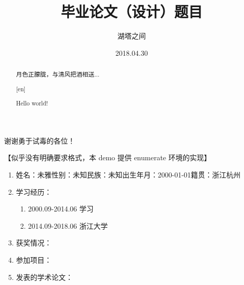 \documentclass[fangfont=STFANGSO.TTF,heifont=simhei.ttf,nocolorbib]{zju-thesis}
\title{毕业论文（设计）题目}{浙江大学本科生毕业论文（设计）}
\author{湖塔之间}{3140100000}
\date{2018.04.30}
\begin{document}
	\makecover
	
	\begin{acknowledgement}
	谢谢勇于试毒的各位！
	\end{acknowledgement}
	\begin{abstract}
	月色正朦胧，与清风把酒相送...


	\end{abstract}
	\begin{abstract}[en]

	Hello world!

	\end{abstract}
	
    \tableofcontents
	\begin{refsection}
	
	\end{refsection}
	\begin{resume}
		【似乎没有明确要求格式，本 demo 提供 enumerate 环境的实现】

		\begin{enumerate}[label=,leftmargin=0em]
		\item 姓名：未雅\quad 性别：未知\quad 民族：未知\quad 出生年月：2000-01-01\quad 籍贯：浙江杭州
		\item 学习经历：
		\begin{enumerate}[label=]
		\item 2000.09-2014.06 学习
		\item 2014.09-2018.06 浙江大学
		\end{enumerate}
		\item 获奖情况：
		\item 参加项目：
		\item 发表的学术论文：
		\end{enumerate}
	\end{resume}


	
	
\end{document}
